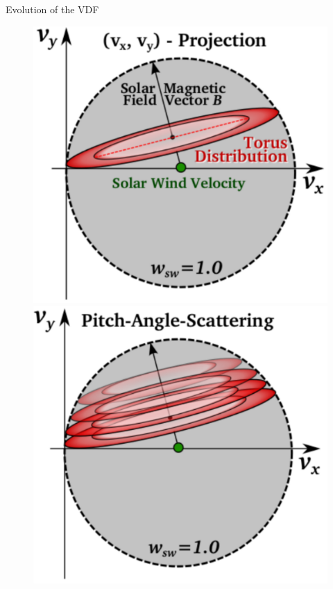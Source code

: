 \documentclass{beamer}
\begin{document}
\begin{frame}{Evolution of the VDF}
	\begin{figure}
		\includegraphics[scale=0.175]{Pics/torus.pdf}
		\hspace{0.001cm}
		\includegraphics[scale=0.175]{Pics/PAS.pdf}
		\hspace{0.001cm}

\end{figure}
\end{frame}
\end{document}
